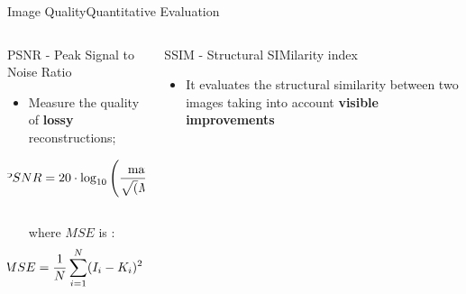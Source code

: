 \documentclass[10pt, unicode]{beamer}
\begin{document}

\begin{frame}{Image Quality}{Quantitative Evaluation}





  \begin{columns}
    \begin{column}{0.48\textwidth}
      \hspace{-0.75cm}
      \begin{block}{PSNR - Peak Signal to Noise Ratio}
        \begin{itemize}
          \item Measure the quality of {\bf lossy} reconstructions;

          \begin{equation*}
          \hspace{-0.75cm}
          PSNR = 20 \cdot \log_{10}\left( \frac{\max(I)}{\sqrt(MSE)} \right)
          \end{equation*}
          \\
          where $MSE$ is :
          \vspace{-0.2cm}
          \begin{equation*}
            \hspace{-0.75cm}
            MSE = \frac{1}{N}\sum_{i=1}^{N} (I_i - K_i)^2
          \end{equation*}
          
        \end{itemize}
      \end{block}
    \end{column}
    \begin{column}{0.6\textwidth}
      \begin{alertblock}{SSIM - Structural SIMilarity index}
        \begin{itemize}
          \vspace{.4cm}
          \item It evaluates the structural similarity between two images taking into account {\bf visible improvements}


\end{itemize}
\end{alertblock}
\end{column}
\end{columns}
\end{frame}
\end{document}
